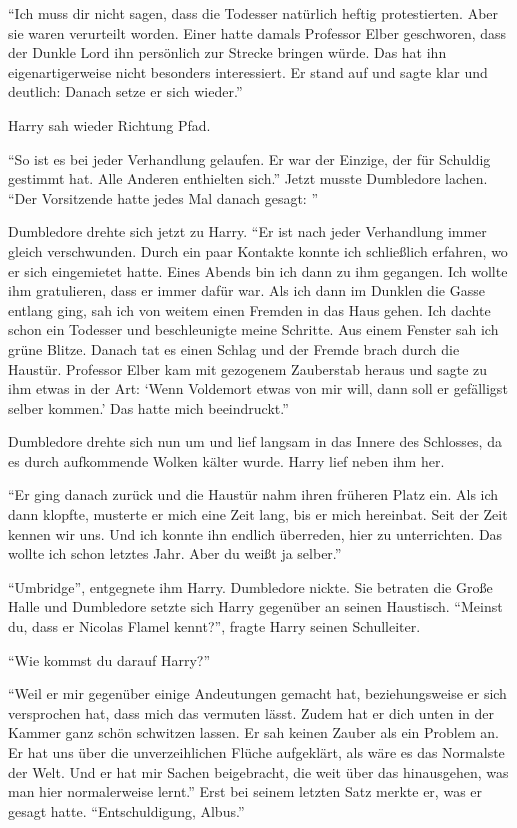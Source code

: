 \enquote{Ich muss dir nicht sagen, dass die Todesser natürlich heftig protestierten. Aber sie waren verurteilt worden. Einer hatte damals Professor Elber geschworen, dass der Dunkle Lord ihn persönlich zur Strecke bringen würde. Das hat ihn eigenartigerweise nicht besonders interessiert. Er stand auf und sagte klar und deutlich:  Danach setze er sich wieder.}

Harry sah wieder Richtung Pfad.

\enquote{So ist es bei jeder Verhandlung gelaufen. Er war der Einzige, der für Schuldig gestimmt hat. Alle Anderen enthielten sich.} Jetzt musste Dumbledore lachen. \enquote{Der Vorsitzende hatte jedes Mal danach gesagt: }

Dumbledore drehte sich jetzt zu Harry. \enquote{Er ist nach jeder Verhandlung immer gleich verschwunden. Durch ein paar Kontakte konnte ich schließlich erfahren, wo er sich eingemietet hatte. Eines Abends bin ich dann zu ihm gegangen. Ich wollte ihm gratulieren, dass er immer dafür war. Als ich dann im Dunklen die Gasse entlang ging, sah ich von weitem einen Fremden in das Haus gehen. Ich dachte schon ein Todesser und beschleunigte meine Schritte. Aus einem Fenster sah ich grüne Blitze. Danach tat es einen Schlag und der Fremde brach durch die Haustür. Professor Elber kam mit gezogenem Zauberstab heraus und sagte zu ihm etwas in der Art: \enquote{Wenn Voldemort etwas von mir will, dann soll er gefälligst selber kommen.} Das hatte mich beeindruckt.}

Dumbledore drehte sich nun um und lief langsam in das Innere des Schlosses, da es durch aufkommende Wolken kälter wurde. Harry lief neben ihm her.

\enquote{Er ging danach zurück und die Haustür nahm ihren früheren Platz ein. Als ich dann klopfte, musterte er mich eine Zeit lang, bis er mich hereinbat. Seit der Zeit kennen wir uns. Und ich konnte ihn endlich überreden, hier zu unterrichten. Das wollte ich schon letztes Jahr. Aber du weißt ja selber.}

\enquote{Umbridge}, entgegnete ihm Harry. Dumbledore nickte. Sie betraten die Große Halle und Dumbledore setzte sich Harry gegenüber an seinen Haustisch. \enquote{Meinst du, dass er Nicolas Flamel kennt?}, fragte Harry seinen Schulleiter.

\enquote{Wie kommst du darauf Harry?}

\enquote{Weil er mir gegenüber einige Andeutungen gemacht hat, beziehungsweise er sich versprochen hat, dass mich das vermuten lässt. Zudem hat er dich unten in der Kammer ganz schön schwitzen lassen. Er sah keinen Zauber als ein Problem an. Er hat uns über die unverzeihlichen Flüche aufgeklärt, als wäre es das Normalste der Welt. Und er hat mir Sachen beigebracht, die weit über das hinausgehen, was man hier normalerweise lernt.} Erst bei seinem letzten Satz merkte er, was er gesagt hatte. \enquote{Entschuldigung, Albus.}

